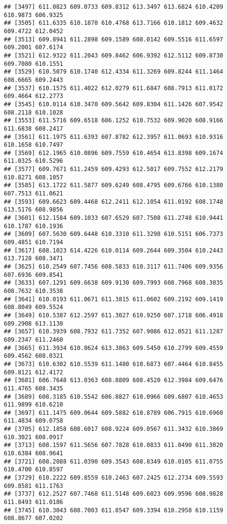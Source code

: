 \documentclass[
]{article}
\begin{document}
\begin{verbatim}
## [3497] 611.0823 609.0733 609.8312 613.3497 613.6824 610.4209 610.9873 606.9325
## [3505] 611.6335 610.1870 610.4768 613.7166 610.1812 609.4632 609.4722 612.0452
## [3513] 609.8941 611.2898 609.1589 608.0142 609.5516 611.6597 609.2001 607.6174
## [3521] 612.9322 611.2043 609.8462 606.9392 612.5112 609.8730 609.7080 610.1551
## [3529] 610.5079 610.1740 612.4334 611.3269 609.8244 611.1464 608.6665 609.2443
## [3537] 610.1575 611.4022 612.0279 611.6847 608.7913 611.0172 609.4664 612.2773
## [3545] 610.0114 610.3470 609.5642 609.8304 611.1426 607.9542 608.2118 610.1028
## [3553] 611.5716 609.6518 606.1252 610.7532 609.9020 608.9166 611.6838 608.2417
## [3561] 611.1975 611.6393 607.8782 612.3957 611.0693 610.9316 610.1658 610.7497
## [3569] 612.1965 610.0896 609.7559 610.4654 613.8398 609.1674 611.0325 610.5296
## [3577] 609.7671 611.2459 609.4293 612.5017 609.7552 612.2179 610.8271 608.1057
## [3585] 613.1722 611.5877 609.6249 608.4795 609.6766 610.1380 607.7513 611.0621
## [3593] 609.6623 609.4468 612.2411 612.1054 611.0192 608.1748 613.5176 608.9856
## [3601] 612.1584 609.1033 607.6529 607.7508 611.2748 610.9441 610.1787 610.1936
## [3609] 607.5630 609.6448 610.3310 611.3298 610.5151 606.7373 609.4851 610.7194
## [3617] 608.1023 614.4226 610.0114 609.2644 609.3504 610.2443 613.7128 608.3471
## [3625] 610.2549 607.7456 608.5833 610.3117 611.7406 609.9356 607.6936 609.8541
## [3633] 607.1291 609.6638 609.9130 609.7993 608.7968 608.3035 608.7632 610.3538
## [3641] 610.0193 611.0671 611.3815 611.0602 609.2192 609.1419 608.8049 609.5524
## [3649] 610.5387 612.2597 611.3027 610.9250 607.1718 606.4918 609.2908 613.1130
## [3657] 610.3939 608.7932 611.7352 607.9086 612.0521 611.1287 609.2347 611.2460
## [3665] 611.3934 610.8624 613.3863 609.5450 610.2799 609.4559 609.4562 608.0321
## [3673] 610.6302 610.5539 611.1480 610.6873 607.4464 610.8455 609.8121 612.4172
## [3681] 606.7648 613.0363 608.8809 608.4520 612.3984 609.6476 611.4765 608.3435
## [3689] 608.3185 610.5542 606.8827 610.0966 609.6807 610.4653 611.9899 610.6210
## [3697] 611.1475 609.0644 609.5882 610.8789 606.7915 610.6960 611.4834 609.0758
## [3705] 612.1858 608.6017 608.9224 609.0567 611.3432 610.3869 610.3021 608.0917
## [3713] 608.1597 611.5656 607.7828 610.0833 611.0490 611.3020 610.6384 608.9641
## [3721] 608.2088 611.0390 609.3543 608.8349 610.0105 611.0755 610.4700 610.8597
## [3729] 610.2222 609.8559 610.2463 607.2425 612.2734 609.5593 609.8581 611.1763
## [3737] 612.2527 607.7468 611.5148 609.6023 609.9596 608.9828 611.8493 611.0186
## [3745] 610.3043 608.7003 611.8547 609.3394 610.2958 610.1159 608.8677 607.0202

\end{verbatim}
\end{document}

